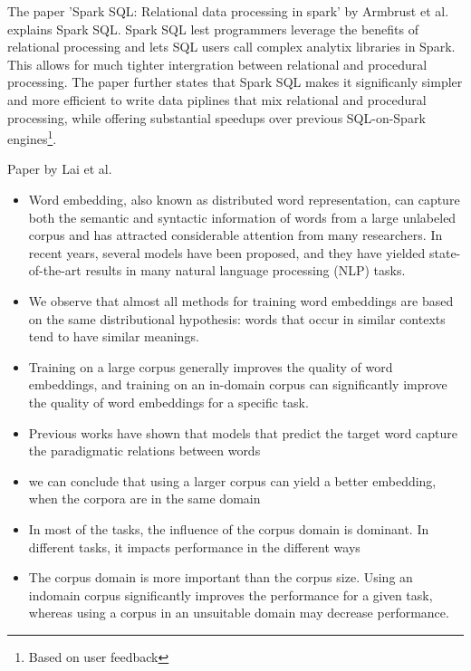 \documentclass[../../Thesis.tex]{subfiles}
\begin{document}
The paper 'Spark SQL: Relational data processing in spark' by Armbrust et al.\cite{armbrust2015spark} explains Spark SQL. Spark SQL lest programmers leverage the benefits of relational processing and lets SQL users call complex analytix libraries in Spark. This allows for much tighter intergration between relational and procedural processing. The paper further states that Spark SQL makes it significanly simpler and more efficient to write data piplines that mix relational and procedural processing, while offering substantial speedups over previous SQL-on-Spark engines\footnote{Based on user feedback}.

Paper by Lai et al.\cite{lai2016generate}
\begin{itemize}
\item{Word embedding, also known as distributed word
representation, can capture both the semantic and syntactic
information of words from a large unlabeled corpus
and has attracted considerable attention from many researchers.
In recent years, several models have been proposed,
and they have yielded state-of-the-art results in many
natural language processing (NLP) tasks.}
\item{We observe that almost
all methods for training word embeddings are based on the
same distributional hypothesis: words that occur in similar
contexts tend to have similar meanings.}
\item{Training on a large corpus
generally improves the quality of word embeddings,
and training on an in-domain corpus can significantly
improve the quality of word embeddings for a specific
task.}
\item{Previous works have shown that models that predict the target word capture the paradigmatic relations between words}
\item{we can conclude that using a larger corpus can yield a better embedding, when the corpora are in the same domain}
\item{In most of the tasks, the influence of the corpus domain is
dominant. In different tasks, it impacts performance in the
different ways}
\item{The corpus
domain is more important than the corpus size. Using an indomain
corpus significantly improves the performance for a
given task, whereas using a corpus in an unsuitable domain
may decrease performance. }
\end{itemize}
\end{document}
